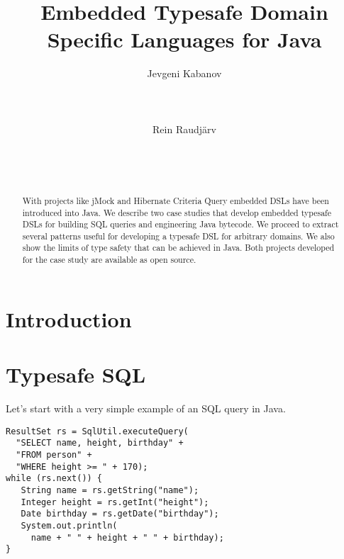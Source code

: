 \documentclass{sig-alternate}
\begin{document}
\title{Embedded Typesafe Domain Specific Languages for Java} 

\author{
	\alignauthor 
		Jevgeni Kabanov\\
       \\
       \\
       \\
	\alignauthor 
		Rein Raudj\"arv\\
       \\
       \\
       \\
}

\date{}

\maketitle

\begin{abstract}
With projects like jMock and Hibernate Criteria Query embedded DSLs have been introduced into Java. We describe two case studies that develop embedded typesafe DSLs for building SQL queries and engineering Java bytecode. We proceed to extract several patterns useful for developing a typesafe DSL for arbitrary domains. We also show the limits of type safety that can be achieved in Java. Both projects developed for the case study are available as open source.
\end{abstract}


\section{Introduction}

\section{Typesafe SQL}

Let's start with a very simple example of an SQL query in Java. 
\begin{verbatim}
ResultSet rs = SqlUtil.executeQuery(
  "SELECT name, height, birthday" + 
  "FROM person" +
  "WHERE height >= " + 170);
while (rs.next()) {
   String name = rs.getString("name");
   Integer height = rs.getInt("height");
   Date birthday = rs.getDate("birthday");
   System.out.println(
     name + " " + height + " " + birthday);
}
\end{verbatim}
\end{document}
